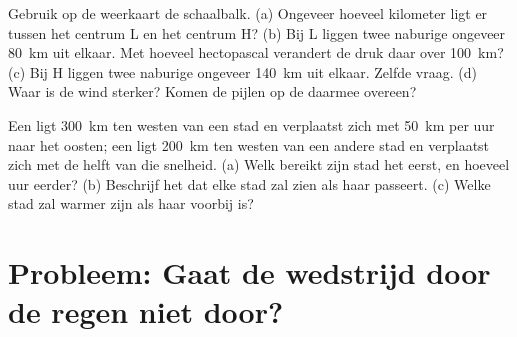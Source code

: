 \begin{exercise}[$\star\star\star$]\label{exo:g8:fronts-and-weather-maps:11}
Gebruik op de weerkaart de schaalbalk. (a) Ongeveer hoeveel kilometer ligt
er tussen het centrum L en het centrum H? (b) Bij L liggen twee naburige
 ongeveer \qty{80}{km} uit elkaar. Met hoeveel hectopascal
verandert de druk daar over \qty{100}{km}? (c) Bij H liggen twee naburige
 ongeveer \qty{140}{km} uit elkaar. Zelfde vraag. (d) Waar is de
wind sterker? Komen de pijlen op de  daarmee overeen?
\end{exercise}

\begin{exercise}[$\star\star\star$]\label{exo:g8:fronts-and-weather-maps:12}
Een  ligt \qty{300}{km} ten westen van een stad en verplaatst zich
met \qty{50}{km} per uur naar het oosten; een  ligt
\qty{200}{km} ten westen van een andere stad en verplaatst zich met de
helft van die snelheid. (a) Welk  bereikt zijn stad het eerst, en
hoeveel uur eerder? (b) Beschrijf het  dat elke stad zal zien als haar
 passeert. (c) Welke stad zal warmer zijn als haar  voorbij is?
\end{exercise}

\section{Probleem: Gaat de wedstrijd door de regen niet door?}

